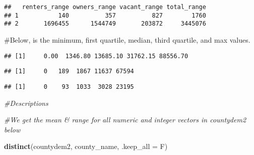 \documentclass[
]{article}
\newenvironment{Shaded}{\begin{snugshade}}{\end{snugshade}}
\newcommand{\CommentTok}[1]{\textcolor[rgb]{0.56,0.35,0.01}{\textit{#1}}}
\newcommand{\DataTypeTok}[1]{\textcolor[rgb]{0.13,0.29,0.53}{#1}}
\newcommand{\DecValTok}[1]{\textcolor[rgb]{0.00,0.00,0.81}{#1}}
\newcommand{\KeywordTok}[1]{\textcolor[rgb]{0.13,0.29,0.53}{\textbf{#1}}}
\newcommand{\NormalTok}[1]{#1}
\newcommand{\OperatorTok}[1]{\textcolor[rgb]{0.81,0.36,0.00}{\textbf{#1}}}
\begin{document}
\begin{verbatim}
##   renters_range owners_range vacant_range total_range
## 1           140          357          827        1760
## 2       1696455      1544749       203872     3445076
\end{verbatim}

\#Below, is the minimum, first quartile, median, third quartile, and max
values.

\begin{Shaded}
\end{Shaded}

\begin{verbatim}
## [1]     0.00  1346.80 13685.10 31762.15 88556.70
\end{verbatim}

\begin{Shaded}
\end{Shaded}

\begin{verbatim}
## [1]     0   189  1867 11637 67594
\end{verbatim}

\begin{Shaded}
\end{Shaded}

\begin{verbatim}
## [1]     0    93  1033  3028 23195
\end{verbatim}

\begin{Shaded}
\begin{Highlighting}[]
\CommentTok{#Descriptions}

\CommentTok{#We get the mean & range for all numeric and integer vectors in countydem2 below}

\KeywordTok{distinct}\NormalTok{(countydem2, county_name, }\DataTypeTok{.keep_all =}\NormalTok{ F)}
\end{Highlighting}
\end{Shaded}
\end{document}
